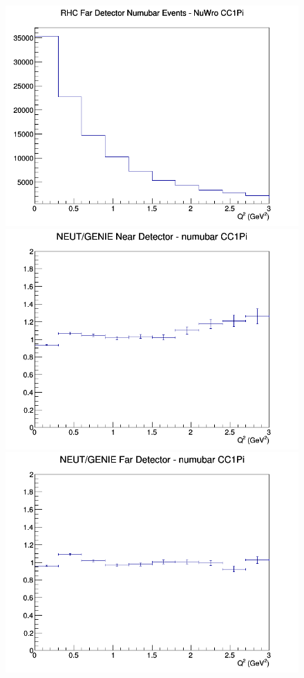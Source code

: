 \documentclass[12pt]{article}
\begin{document}
\begin{figure}[h]
\endminipage
{}
\includegraphics[width=\linewidth]{eff_Q2/LAr/CC1Pi_RHC_FD_numubar_Q2_NuWro.png}
\endminipage
\newline
{}
\includegraphics[width=\linewidth]{eff_Q2/LAr/ratios/CC1Pi_NEUT_GENIE_numubar_near_Q2.png}
\endminipage
{}
\includegraphics[width=\linewidth]{eff_Q2/LAr/ratios/CC1Pi_NEUT_GENIE_numubar_far_Q2.png}

\end{figure}
\end{document}
